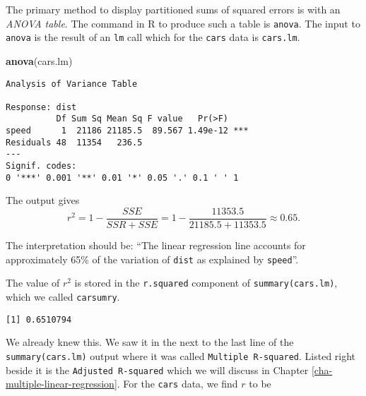 \documentclass[]{book}
\newenvironment{Shaded}{\begin{snugshade}}{\end{snugshade}}
\newcommand{\KeywordTok}[1]{\textcolor[rgb]{0.13,0.29,0.53}{\textbf{{#1}}}}
\newcommand{\NormalTok}[1]{{#1}}
\numberwithin{equation}{chapter}
\numberwithin{figure}{chapter}
\theoremstyle{plain}
\theoremstyle{definition}
\theoremstyle{remark}
\theoremstyle{definition}
\theoremstyle{definition}
\theoremstyle{remark}
\begin{document}
The primary method to display partitioned sums of squared errors is with
an \emph{ANOVA table}. The command in R to produce such a table is
\texttt{anova}. The input to \texttt{anova} is the result of an
\texttt{lm} call which for the \texttt{cars} data is \texttt{cars.lm}.

\begin{Shaded}
\begin{Highlighting}[]
\KeywordTok{anova}\NormalTok{(cars.lm)}
\end{Highlighting}
\end{Shaded}

\begin{verbatim}
Analysis of Variance Table

Response: dist
          Df Sum Sq Mean Sq F value   Pr(>F)    
speed      1  21186 21185.5  89.567 1.49e-12 ***
Residuals 48  11354   236.5                     
---
Signif. codes:  
0 '***' 0.001 '**' 0.01 '*' 0.05 '.' 0.1 ' ' 1
\end{verbatim}

The output gives \[
r^{2}=1-\frac{SSE}{SSR+SSE}=1-\frac{11353.5}{21185.5+11353.5}\approx0.65.
\]

The interpretation should be: ``The linear regression line accounts for
approximately 65\% of the variation of \texttt{dist} as explained by
\texttt{speed}''.

The value of \(r^{2}\) is stored in the \texttt{r.squared} component of
\texttt{summary(cars.lm)}, which we called \texttt{carsumry}.

\begin{Shaded}
\end{Shaded}

\begin{verbatim}
[1] 0.6510794
\end{verbatim}

We already knew this. We saw it in the next to the last line of the
\texttt{summary(cars.lm)} output where it was called
\texttt{Multiple\ R-squared}. Listed right beside it is the
\texttt{Adjusted\ R-squared} which we will discuss in Chapter
\ref{cha-multiple-linear-regression}. For the \texttt{cars} data, we
find \(r\) to be

\begin{Shaded}
\end{Shaded}
\end{document}

